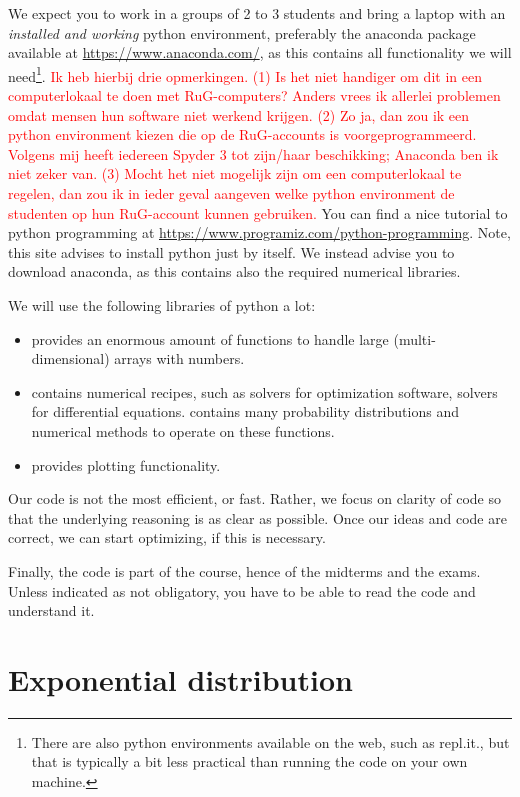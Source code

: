 \documentclass{scrartcl}
\newcommand{\notet}[1]{\textcolor{red}{#1}}
\begin{document}
We expect you to work in a groups of 2 to 3 students and bring a laptop with an \emph{installed and working} python environment, preferably  the anaconda package available at \url{https://www.anaconda.com/},  as this contains all functionality we will need\footnote{There are also python environments available on the web, such as repl.it., but that is typically a bit less practical than running the code on your own machine.}. \notet{Ik heb hierbij drie opmerkingen. (1) Is het niet handiger om dit in een computerlokaal te doen met RuG-computers? Anders vrees ik allerlei problemen omdat mensen hun software niet werkend krijgen. (2) Zo ja, dan zou ik een python environment kiezen die op de RuG-accounts is voorgeprogrammeerd. Volgens mij heeft iedereen Spyder 3 tot zijn/haar beschikking; Anaconda ben ik niet zeker van. (3) Mocht het niet mogelijk zijn om een computerlokaal te regelen, dan zou ik in ieder geval aangeven welke python environment de studenten op hun RuG-account kunnen gebruiken. } You can find a nice tutorial to python programming at  \url{https://www.programiz.com/python-programming}. Note, this site advises to install python just by itself. We instead advise you to download anaconda, as this contains also the required numerical libraries. 

We will use the following libraries of python a lot:
\begin{itemize}
\item {}  provides an enormous amount of functions to handle large (multi-dimensional) arrays with numbers. 
\item {} contains numerical recipes, such as solvers for optimization software, solvers for differential equations.  contains many probability distributions and numerical methods to operate on these functions. 
\item {} provides plotting functionality.
\end{itemize}

Our code is not the most efficient, or fast. Rather, we focus on clarity of code so that the underlying reasoning is as clear as possible. Once our ideas and code are correct, we can start optimizing, if this is necessary. 

Finally, the code is part of the course, hence of the midterms and the exams.  Unless indicated as not obligatory, you have to be able to read the code and understand it.


\clearpage
\section{Exponential distribution}
\end{document}
